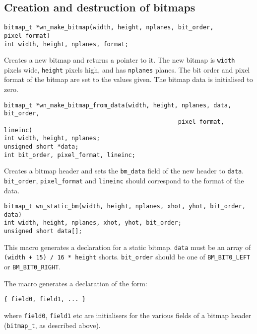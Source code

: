 \subsection{Creation and destruction of bitmaps}
\begin{verbatim}
bitmap_t *wn_make_bitmap(width, height, nplanes, bit_order, pixel_format)
int width, height, nplanes, format;
\end{verbatim}
Creates a new bitmap and returns a pointer to it.
The new bitmap is {\tt width} pixels wide, {\tt height} pixels high, and has
{\tt nplanes} planes.
The bit order and pixel format of the bitmap are set to the values given.
The bitmap data is initialised to zero. 
\begin{verbatim}
bitmap_t *wn_make_bitmap_from_data(width, height, nplanes, data, bit_order,
                                                 pixel_format, lineinc)
int width, height, nplanes;
unsigned short *data;
int bit_order, pixel_format, lineinc;
\end{verbatim}
Creates a bitmap header and sets the {\tt bm\_data} field of the new header
to {\tt data}.
{\tt bit\_order}, {\tt pixel\_format} and {\tt lineinc} should correspond
to the format of the data.
\begin{verbatim}
bitmap_t wn_static_bm(width, height, nplanes, xhot, yhot, bit_order, data)
int width, height, nplanes, xhot, yhot, bit_order;
unsigned short data[];
\end{verbatim}
This macro generates a declaration for a static bitmap.
{\tt data} must be an array of {\tt (width + 15) / 16 * height} shorts.
{\tt bit\_order} should be one of {\tt BM\_BIT0\_LEFT} or {\tt BM\_BIT0\_RIGHT}.

The macro generates a declaration of the form:
\begin{verbatim}
{ field0, field1, ... }
\end{verbatim}
where {\tt field0}, {\tt field1} etc are initialisers for the various
fields of a bitmap header ({\tt bitmap\_t}, as described above).

